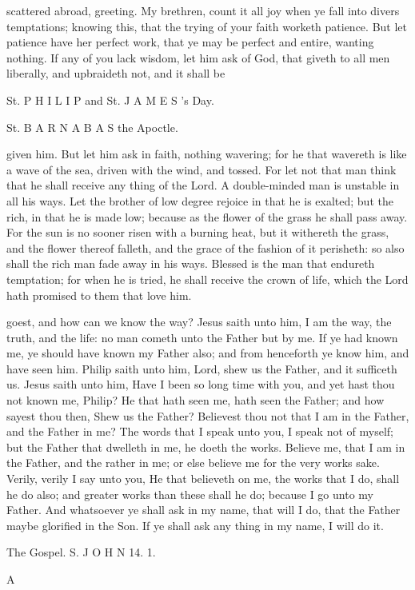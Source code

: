 scattered abroad, greeting. My brethren, count it all joy when ye fall into divers temptations; knowing this, that the trying of your faith worketh patience. But let patience have her perfect work, that ye may be perfect and entire, wanting nothing. If any of you lack wisdom, let him ask of God, that giveth to all men liberally, and upbraideth not, and it shall be

St. P H I L I P and St. J A M E S ’s Day.

St. B A R N A B A S the Apoctle.

given him. But let him ask in faith, nothing wavering; for he that wavereth is like a wave of the sea, driven with the wind, and tossed. For let not that man think that he shall receive any thing of the Lord. A double-minded man is unstable in all his ways. Let the brother of low degree rejoice in that he is exalted; but the rich, in that he is made low; because as the flower of the grass he shall pass away. For the sun is no sooner risen with a burning heat, but it withereth the grass, and the flower thereof falleth, and the grace of the fashion of it perisheth: so also shall the rich man fade away in his ways. Blessed is the man that endureth temptation; for when he is tried, he shall receive the crown of life, which the Lord hath promised to them that love him.

goest, and how can we know the way? Jesus saith unto him, I am the way, the truth, and the life: no man cometh unto the Father but by me. If ye had known me, ye should have known my Father also; and from henceforth ye know him, and have seen him. Philip saith unto him, Lord, shew us the Father, and it sufficeth us. Jesus saith unto him, Have I been so long time with you, and yet hast thou not known me, Philip? He that hath seen me, hath seen the Father; and how sayest thou then, Shew us the Father? Believest thou not that I am in the Father, and the Father in me? The words that I speak unto you, I speak not of myself; but the Father that dwelleth in me, he doeth the works. Believe me, that I am in the Father, and the rather in me; or else believe me for the very works sake. Verily, verily I say unto you, He that believeth on me, the works that I do, shall he do also; and greater works than these shall he do; because I go unto my Father. And whatsoever ye shall ask in my name, that will I do, that the Father maybe glorified in the Son. If ye shall ask any thing in my name, I will do it.

The Gospel. S. J O H N 14. 1.

A

